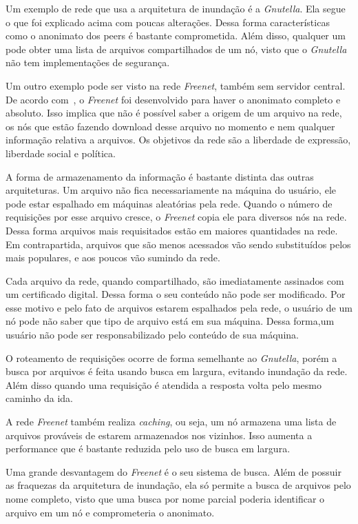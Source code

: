 Um exemplo de rede que usa a arquitetura de inundação é a \emph{Gnutella}. Ela segue o que foi explicado acima com poucas alterações. Dessa forma características como o anonimato dos peers é bastante comprometida. Além disso, qualquer um pode obter uma lista de arquivos compartilhados de um nó, visto que o \emph{Gnutella} não tem implementações de segurança.

Um outro exemplo pode ser visto na rede \emph{Freenet}, também sem servidor central. De acordo com~\cite{ian02}, o \emph{Freenet} foi desenvolvido para haver o anonimato completo e absoluto. Isso implica que não é possível saber a origem de um arquivo na rede, os nós que estão fazendo download desse arquivo no momento e nem qualquer informação relativa a arquivos. Os objetivos da rede são a liberdade de expressão, liberdade social e política.

A forma de armazenamento da informação é bastante distinta das outras arquiteturas. Um arquivo não fica necessariamente na máquina do usuário, ele pode estar espalhado em máquinas aleatórias pela rede. Quando o número de requisições por esse arquivo cresce, o \emph{Freenet} copia ele para diversos nós na rede. Dessa forma arquivos mais requisitados estão em maiores quantidades na rede. Em contrapartida, arquivos que são menos acessados vão sendo substituídos pelos mais populares, e aos poucos vão sumindo da rede.

Cada arquivo da rede, quando compartilhado, são imediatamente assinados com um certificado digital. Dessa forma o seu conteúdo não pode ser modificado. Por esse motivo e pelo fato de arquivos estarem espalhados pela rede, o usuário de um nó pode não saber que tipo de arquivo está em sua máquina. Dessa forma,um usuário não pode ser responsabilizado pelo conteúdo de sua máquina.

O roteamento de requisições ocorre de forma semelhante ao \emph{Gnutella}, porém a busca por arquivos é feita usando busca em largura, evitando inundação da rede. Além disso quando uma requisição é atendida a resposta volta pelo mesmo caminho da ida.

A rede \emph{Freenet} também realiza \emph{caching}, ou seja, um nó armazena uma lista de arquivos prováveis de estarem armazenados nos vizinhos. Isso aumenta a performance que é bastante reduzida pelo uso de busca em largura.

Uma grande desvantagem do \emph{Freenet} é o seu sistema de busca. Além de possuir as fraquezas da arquitetura de inundação, ela só permite a busca de arquivos pelo nome completo, visto que uma busca por nome parcial poderia identificar o arquivo em um nó e comprometeria o anonimato.


